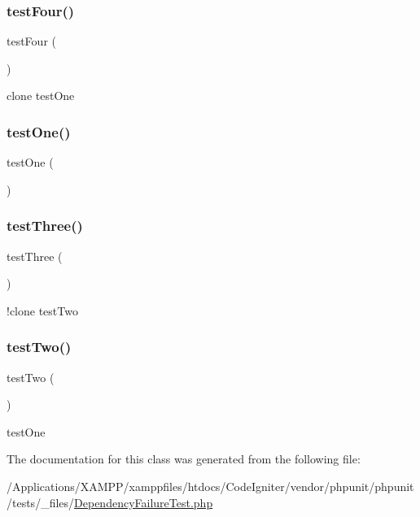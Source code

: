 \subsubsection{\texorpdfstring{test\+Four()}{testFour()}}
{\footnotesize\ttfamily test\+Four (\begin{DoxyParamCaption}{ }\end{DoxyParamCaption})}

clone test\+One \mbox{\label{class_dependency_failure_test_afbf3ff88b322c6a7197ce02297cd23a0}} 
\subsubsection{\texorpdfstring{test\+One()}{testOne()}}
{\footnotesize\ttfamily test\+One (\begin{DoxyParamCaption}{ }\end{DoxyParamCaption})}

\mbox{\label{class_dependency_failure_test_a0bd6c752e665cd0e690512ca38d15d41}} 
\subsubsection{\texorpdfstring{test\+Three()}{testThree()}}
{\footnotesize\ttfamily test\+Three (\begin{DoxyParamCaption}{ }\end{DoxyParamCaption})}

!clone test\+Two \mbox{\label{class_dependency_failure_test_a4fb9974ce113d5d1db8075e0db0dc9b6}} 
\subsubsection{\texorpdfstring{test\+Two()}{testTwo()}}
{\footnotesize\ttfamily test\+Two (\begin{DoxyParamCaption}{ }\end{DoxyParamCaption})}

test\+One 

The documentation for this class was generated from the following file\+:\begin{DoxyCompactItemize}
\item 
/\+Applications/\+X\+A\+M\+P\+P/xamppfiles/htdocs/\+Code\+Igniter/vendor/phpunit/phpunit/tests/\+\_\+files/\mbox{\hyperlink{_dependency_failure_test_8php}{Dependency\+Failure\+Test.\+php}}\end{DoxyCompactItemize}
